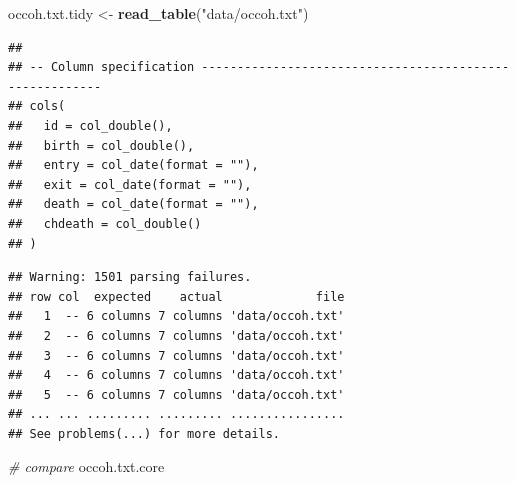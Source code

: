\documentclass[
]{book}
\newenvironment{Shaded}{\begin{snugshade}}{\end{snugshade}}
\newcommand{\CommentTok}[1]{\textcolor[rgb]{0.56,0.35,0.01}{\textit{#1}}}
\newcommand{\FunctionTok}[1]{\textcolor[rgb]{0.13,0.29,0.53}{\textbf{#1}}}
\newcommand{\NormalTok}[1]{#1}
\newcommand{\OtherTok}[1]{\textcolor[rgb]{0.56,0.35,0.01}{#1}}
\newcommand{\StringTok}[1]{\textcolor[rgb]{0.31,0.60,0.02}{#1}}
\theoremstyle{definition}
\theoremstyle{definition}
\theoremstyle{definition}
\theoremstyle{definition}
\theoremstyle{remark}
\begin{document}
\begin{Shaded}
\begin{Highlighting}[]
\NormalTok{occoh.txt.tidy }\OtherTok{\textless{}{-}} \FunctionTok{read\_table}\NormalTok{(}\StringTok{"data/occoh.txt"}\NormalTok{)}
\end{Highlighting}
\end{Shaded}

\begin{verbatim}
## 
## -- Column specification --------------------------------------------------------
## cols(
##   id = col_double(),
##   birth = col_double(),
##   entry = col_date(format = ""),
##   exit = col_date(format = ""),
##   death = col_date(format = ""),
##   chdeath = col_double()
## )
\end{verbatim}

\begin{verbatim}
## Warning: 1501 parsing failures.
## row col  expected    actual             file
##   1  -- 6 columns 7 columns 'data/occoh.txt'
##   2  -- 6 columns 7 columns 'data/occoh.txt'
##   3  -- 6 columns 7 columns 'data/occoh.txt'
##   4  -- 6 columns 7 columns 'data/occoh.txt'
##   5  -- 6 columns 7 columns 'data/occoh.txt'
## ... ... ......... ......... ................
## See problems(...) for more details.
\end{verbatim}

\begin{Shaded}
\begin{Highlighting}[]
\CommentTok{\# compare}
\NormalTok{occoh.txt.core}
\end{Highlighting}
\end{Shaded}
\end{document}
